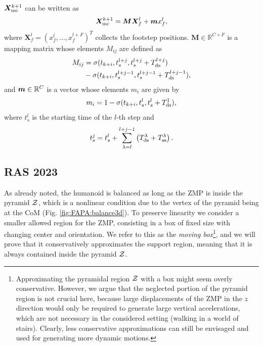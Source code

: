 $\bm{X}_{\rm mc}^{k+1}$ can be written as
\begin{equation}
\label{eq:FAPA:mapping}
\bm{X}_{\rm mc}^{k+1} = \bm{M} \bm{X}_f^l + \bm{m}x_f^l,
\end{equation}
where $\bm{X}_{f}^{l} = (x_{f}^{l}, \dots, x_{f}^{l+F})^T$ collects the footstep positions. $\bm{M}\in\mathbb{R}^{C\times F}$ is a mapping matrix whose elements $M_{ij}$ are defined as
\begin{equation}\begin{split}
M_{ij} &= \sigma(t_{k+i}, t_s^{l+j},t_s^{l+j}+T_{\rm ds}^{l+j})\\ &- \sigma(t_{k+i}, t_s^{l+j-1},t_s^{l+j-1}+T_{\rm ds}^{l+j-1}),
\end{split}\end{equation}
and ${\bm{m}}\in\mathbb{R}^{C}$ is a vector whose elements $m_i$ are given by
\begin{equation*}
m_{i} = 1 - \sigma(t_{k+i}, t_s^{l},t_s^{l}+T_{\rm ds}^{1}),
\end{equation*}
where $t_s^l$ is the starting time of the $l$-th step and
\begin{equation*}
    t^j_s = t^l_s + \sum^{l+j-1}_{\lambda=l} \left(T_{\rm ds}^\lambda + T_{\rm ss}^\lambda\right).
\end{equation*}

\subsection{RAS 2023}
As already noted, the humanoid is balanced as long as the ZMP is inside the pyramid $\cal Z$, which is a nonlinear condition due to the vertex of the pyramid being at the CoM (Fig. \ref{fig:FAPA:balance3d}). To preserve linearity we consider a smaller allowed region for the ZMP, consisting in a box of fixed size with changing center and orientation. We refer to this as the {\em moving box}\footnote{Approximating the pyramidal region $\cal Z$ with a box might seem overly conservative. However, we argue that the neglected portion of the pyramid region is not crucial here, because large displacements of the ZMP in the $z$ direction would only be required to generate large vertical accelerations, which are not necessary in the considered setting (walking in a world of stairs). Clearly, less conservative approximations can still be envisaged and used for generating more dynamic motions.}, and we will prove that it conservatively approximates the support region, meaning that it is always contained inside the pyramid $\cal Z$.

